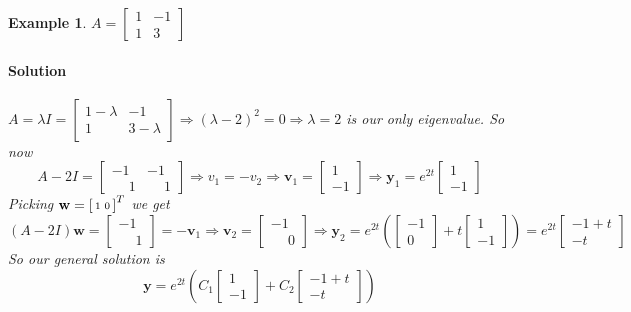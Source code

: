 \documentclass[letterpaper, 11pt, openany]{book}
\theoremstyle{mytheoremstyle}
\theoremstyle{myexamplestyle}
\newtheorem{example}{Example}[section]
\newenvironment{solution}{\paragraph{\sffamily \smaller \fontseries{b}\selectfont Solution}}{\hfill\faSquare}
\begin{document}
\begin{example}\label{e:de-rep-ev-pos}
    \(A = \begin{bmatrix}
        1 & -1 \\
        1 & 3
    \end{bmatrix}\)
    \begin{solution}
        \(A= \lambda I = \begin{bmatrix}
            1-\lambda  & -1 \\
            1 & 3-\lambda
        \end{bmatrix} \Rightarrow (\lambda - 2)^{2} = 0 \Rightarrow \lambda = 2\) is our only eigenvalue. So now
        \[A - 2I = \begin{bmatrix}
            -1 & -1 \\
             \phantom{-}1 &  \phantom{-}1
        \end{bmatrix} \Rightarrow v_{1} = -v_{2} \Rightarrow \mathbf{v}_{1} = \begin{bmatrix}1 \\ -1\end{bmatrix} \Rightarrow \mathbf{y}_{1} = e^{2t} \begin{bmatrix}1 \\ -1\end{bmatrix}\]
        Picking \(\mathbf{w} = \begin{bsmallmatrix}
            1 & 0
        \end{bsmallmatrix}^{T}\) we get
        \[(A - 2I)\mathbf{w} = \begin{bmatrix}-1\\  \phantom{-}1\end{bmatrix} = -\mathbf{v}_{1} \Rightarrow \mathbf{v}_{2} = \begin{bmatrix}-1 \\  \phantom{-}0\end{bmatrix} \Rightarrow \mathbf{y}_{2} = e^{2t}\left(\begin{bmatrix}-1 \\ 0\end{bmatrix} + t \begin{bmatrix}1 \\ -1\end{bmatrix}\right) = e^{2t}\begin{bmatrix}-1 + t \\ -t\end{bmatrix}\]
        So our general solution is
        \[\mathbf{y} = e^{2t}\left(C_{1} \begin{bmatrix}1 \\ -1\end{bmatrix} + C_{2}\begin{bmatrix}-1 + t \\ -t\end{bmatrix} \right)\]

\end{solution}
\end{example}
\end{document}
